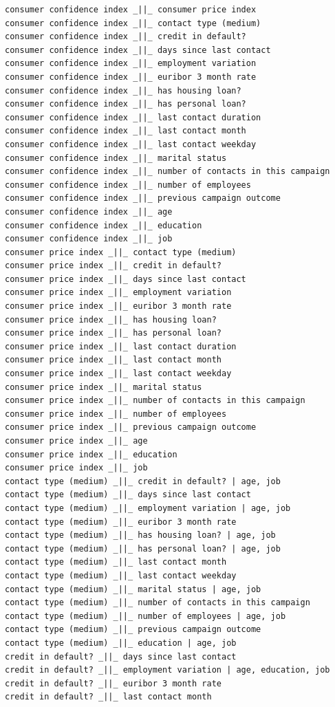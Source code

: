 \documentclass[11pt,]{article}
\begin{document}
\begin{verbatim}
consumer confidence index _||_ consumer price index
consumer confidence index _||_ contact type (medium)
consumer confidence index _||_ credit in default?
consumer confidence index _||_ days since last contact
consumer confidence index _||_ employment variation
consumer confidence index _||_ euribor 3 month rate
consumer confidence index _||_ has housing loan?
consumer confidence index _||_ has personal loan?
consumer confidence index _||_ last contact duration
consumer confidence index _||_ last contact month
consumer confidence index _||_ last contact weekday
consumer confidence index _||_ marital status
consumer confidence index _||_ number of contacts in this campaign
consumer confidence index _||_ number of employees
consumer confidence index _||_ previous campaign outcome
consumer confidence index _||_ age
consumer confidence index _||_ education
consumer confidence index _||_ job
consumer price index _||_ contact type (medium)
consumer price index _||_ credit in default?
consumer price index _||_ days since last contact
consumer price index _||_ employment variation
consumer price index _||_ euribor 3 month rate
consumer price index _||_ has housing loan?
consumer price index _||_ has personal loan?
consumer price index _||_ last contact duration
consumer price index _||_ last contact month
consumer price index _||_ last contact weekday
consumer price index _||_ marital status
consumer price index _||_ number of contacts in this campaign
consumer price index _||_ number of employees
consumer price index _||_ previous campaign outcome
consumer price index _||_ age
consumer price index _||_ education
consumer price index _||_ job
contact type (medium) _||_ credit in default? | age, job
contact type (medium) _||_ days since last contact
contact type (medium) _||_ employment variation | age, job
contact type (medium) _||_ euribor 3 month rate
contact type (medium) _||_ has housing loan? | age, job
contact type (medium) _||_ has personal loan? | age, job
contact type (medium) _||_ last contact month
contact type (medium) _||_ last contact weekday
contact type (medium) _||_ marital status | age, job
contact type (medium) _||_ number of contacts in this campaign
contact type (medium) _||_ number of employees | age, job
contact type (medium) _||_ previous campaign outcome
contact type (medium) _||_ education | age, job
credit in default? _||_ days since last contact
credit in default? _||_ employment variation | age, education, job
credit in default? _||_ euribor 3 month rate
credit in default? _||_ last contact month

\end{verbatim}
\end{document}
